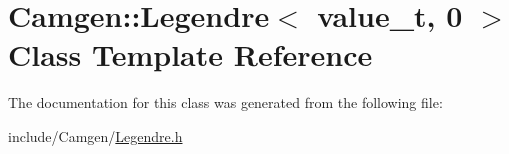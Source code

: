 \hypertarget{a00320}{\section{Camgen\-:\-:Legendre$<$ value\-\_\-t, 0 $>$ Class Template Reference}
\label{a00320}
}


The documentation for this class was generated from the following file\-:\begin{DoxyCompactItemize}
\item 
include/\-Camgen/\hyperlink{a00657}{Legendre.\-h}\end{DoxyCompactItemize}
